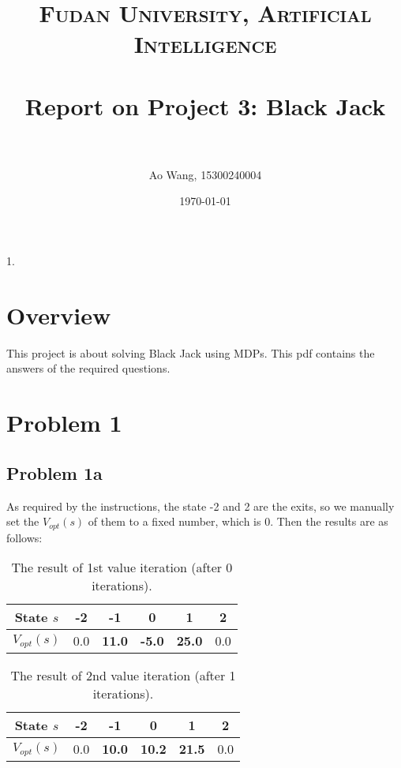 \documentclass[paper=a4, fontsize=10pt]{scrartcl} %
\title{	
\normalfont \normalsize 
\textsc{Fudan University, Artificial Intelligence} \\ [0pt] %
\horrule{1pt} \\[0.4cm] %
\LARGE Report on Project 3: Black Jack \\ %
\horrule{1pt} \\[0cm] %
}
\author{Ao Wang, 15300240004} %
\date{\normalsize\today} %
\numberwithin{equation}{section} %
\numberwithin{figure}{section} %
\numberwithin{table}{section} %
\begin{document}
\begin{spacing}{1.}

\maketitle %

\section{Overview}
This project is about solving Black Jack using MDPs. This pdf contains the answers of the required questions.

\section{Problem 1}
\subsection{Problem 1a}
As required by the instructions, the state -2 and 2 are the exits, so we manually set the $V_{opt}(s)$ of them to a fixed number, which is 0. Then the results are as follows:
\begin{table}[h]
\setlength{\abovecaptionskip}{0.cm}
\setlength{\belowcaptionskip}{-0.cm}
\centering
  \caption{The result of 1st value iteration (after 0 iterations).}
  \begin{tabular}{|c|c|c|c|c|c|}
     \hline
    State $s$ & -2 & -1 & 0 & 1 & 2\\
     \hline
    $V_{opt}(s)$ & 0.0 & \textbf{11.0} & \textbf{-5.0} & \textbf{25.0} & 0.0\\
     \hline
  \end{tabular}
\end{table}

\begin{table}[h]
\setlength{\abovecaptionskip}{0.cm}
\setlength{\belowcaptionskip}{-0.cm}
\centering
  \caption{The result of 2nd value iteration (after 1 iterations).}
  \begin{tabular}{|c|c|c|c|c|c|}
     \hline
    State $s$ & -2 & -1 & 0 & 1 & 2\\
     \hline
    $V_{opt}(s)$ & 0.0 & \textbf{10.0} & \textbf{10.2} & \textbf{21.5} & 0.0\\
     \hline
  \end{tabular}
\end{table}


\end{spacing}
\end{document}
